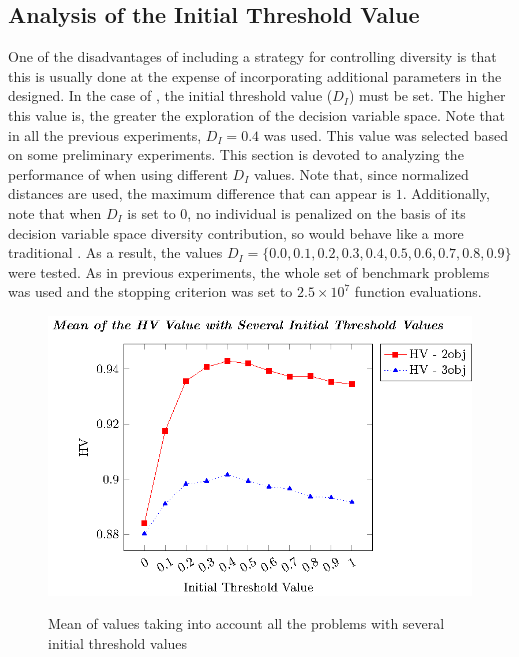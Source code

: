\subsection{Analysis of the Initial Threshold Value}

One of the disadvantages of including a strategy for controlling diversity is that this is usually done at the expense of
incorporating additional parameters in the \EA{} designed.
%
In the case of \VSDMOEA{}, the initial threshold value ($D_I$) must be set.
%
The higher this value is, the greater the exploration of the decision variable space.
%
Note that in all the previous experiments, $D_I = 0.4$ was used.
%
This value was selected based on some preliminary experiments.
%
This section is devoted to analyzing the performance of \VSDMOEA{} when using different $D_I$ values. 
%
Note that, since normalized distances are used, the maximum difference that can appear is $1$.
%
Additionally, note that when $D_I$ is set to 0, no individual is penalized on the basis of its decision
variable space diversity contribution,
so \VSDMOEA{} would behave like a more traditional \MOEA{}.
%
As a result, the values $D_I = \{0.0, 0.1, 0.2, 0.3, 0.4, 0.5, 0.6, 0.7, 0.8, 0.9\}$ were tested.
%
As in previous experiments, the whole set of benchmark problems was used and
the stopping criterion was set to $2.5 \times 10^7$ function evaluations.

\begin{figure}[t]
\centering
\includegraphics[scale=0.85]{Images/Graphic-Initial-Distance_tikz-figure0.eps} \\
\caption{Mean of \HV{} values taking into account all the problems with several initial threshold values}\label{fig:Initial-distance-factor}
\end{figure}

